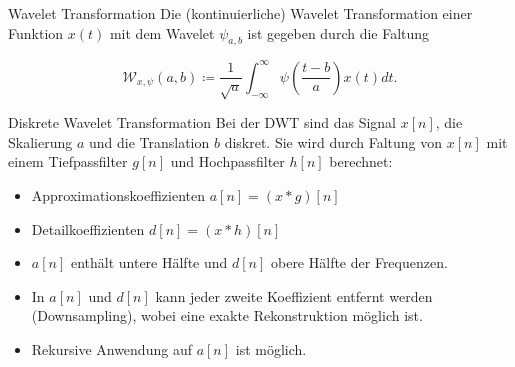 \documentclass[aspectratio=169, 12pt]{beamer}
\begin{document}
\begin{frame}{Wavelet Transformation}
  Die (kontinuierliche) Wavelet Transformation einer Funktion $x(t)$ mit dem Wavelet $\psi_{a, b}$ ist gegeben durch die Faltung
  \begin{small}
    \begin{equation*}
      \mathcal{W}_{x, \psi}(a, b) \coloneqq \frac{1}{\sqrt{a}} \int_{-\infty}^{\infty} \psi \left( \frac{t-b}{a} \right) x(t) dt.
    \end{equation*}
  \end{small}
  \vspace{-0.35cm}
  \begin{center}
    \resizebox{0.34\textwidth}{!}{%
      
    }
    \qquad
    \resizebox{0.34\textwidth}{!}{%
      
    }
  \end{center}
\end{frame}

\begin{frame}{Diskrete Wavelet Transformation}
  Bei der DWT sind das Signal $x[n]$, die Skalierung $a$ und die Translation $b$ diskret.
  Sie wird durch Faltung von $x[n]$ mit einem Tiefpassfilter $g[n]$ und Hochpassfilter $h[n]$ berechnet:
  \begin{itemize}
    \item Approximationskoeffizienten $a[n] = \left(x*g\right)[n]$
    \item Detailkoeffizienten $d[n] = \left(x*h\right)[n]$
    \item $a[n]$ enthält untere Hälfte und $d[n]$ obere Hälfte der Frequenzen.
    \item In $a[n]$ und $d[n]$ kann jeder zweite Koeffizient entfernt werden (Downsampling), wobei eine exakte Rekonstruktion möglich ist.
    \item Rekursive Anwendung auf $a[n]$ ist möglich.
  \end{itemize}
\end{frame}

\begin{frame}
  \resizebox{\textwidth}{!}{%
    
  }
\end{frame}
\end{document}
